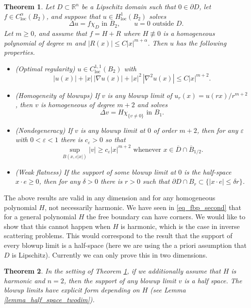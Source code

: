 \documentclass[11pt,a4paper]{amsart}
\newtheorem{Theorem}{Theorem}[section]
\theoremstyle{definition}
\numberwithin{equation}{section}
\newcommand{\mR}{\mathbb{R}}                    %
\newcommand{\abs}[1]{\lvert #1 \rvert}          %
\newcommand{\ol}[1]{\overline{#1}}
\newcommand{\eps}{\varepsilon}
\newcommand{\p}{\partial}
\begin{document}
\begin{Theorem} \label{thm_fbp_steps}
Let $D \subset \mR^n$ be a Lipschitz domain such that $0 \in \p D$, let $f \in C^{\alpha}_{\mathrm{loc}}(B_2)$, and suppose that $u \in H^1_{\mathrm{loc}}(B_2)$ solves 
\[
\Delta u = f \chi_D \text{ in $B_2$}, \qquad u=0 \text{ outside $D$}.
\]
Let $m \geq 0$, and assume that $f = H + R$ where $H \not\equiv 0$ is a homogeneous polynomial of degree $m$ and $|R(x)| \leq C |x|^{m+\alpha}$. Then $u$ has the following properties.
\begin{itemize}
\item 
\emph{(Optimal regularity)} $u \in C^{1,1}_{\mathrm{loc}}(B_2)$ with 
\[
|u(x)| + |x| \,|\nabla u(x)| + |x|^2 \, |\nabla^2 u(x)| \leq C |x|^{m+2}.
\]
\item 
\emph{(Homogeneity of blowups)} If $v$ is any blowup limit of $u_r(x) = u(rx)/r^{m+2}$, then $v$ is homogeneous of degree $m+2$ and solves 
\[
\Delta v = H \chi_{ \{ v \neq 0 \} } \text{ in $B_1$.}
\]
\item 
\emph{(Nondegeneracy)} If $v$ is any blowup limit at $0$ of order $m+2$, then for any $\eps$ with $0 < \eps < 1$ there is $c_{\eps} > 0$ so that 
\[
\sup_{B(x, \eps \abs{x})} \abs{v} \geq c_{\eps} \abs{x}^{m+2} \text{ whenever $x \in \ol{D} \cap \ol{B}_{1/2}$}.
\]
\item 
\emph{(Weak flatness)} If the support of some blowup limit at $0$ is the half-space $x \cdot e \geq 0$, then for any $\delta > 0$ there is $r > 0$ such that $\p D \cap B_r \subset \{ |x \cdot e| \leq \delta r \}$.
\end{itemize}
\end{Theorem}

The above results are valid in any dimension and for any homogeneous polynomial $H$, not necessarily harmonic. We have seen in \eqref{eq_fbp_second} that for a general polynomial $H$ the free boundary can have corners. We would like to show that this cannot happen when $H$ is harmonic, which is the case in inverse scattering problems. This would correspond to the result that the support of every blowup limit is a half-space (here we are using the a priori assumption that $D$ is Lipschitz). Currently we can only prove this in two dimensions.

\begin{Theorem} \label{thm_blowup_classification_intro}
In the setting of Theorem \ref{thm_fbp_steps}, if we additionally assume that $H$ is harmonic and $n=2$, then the support of any blowup limit $v$ is a half space. The blowup limits have explicit form depending on $H$ (see Lemma \ref{lemma_half_space_twodim}).
\end{Theorem}
\end{document}
